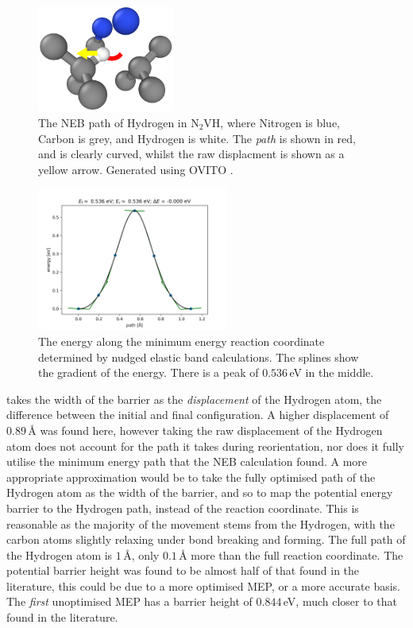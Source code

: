 \documentclass[10pt,a4paper,twocolumn,twoside]{extarticle}
\newcommand{\ntvh}{N$_2$VH}
\begin{document}
\begin{figure}
	\includegraphics[width=0.4\textwidth]{n2vh.png}
	\caption{The NEB path of Hydrogen in \ntvh, where Nitrogen is blue, Carbon is grey, and Hydrogen is white. The \emph{path} is shown in red, and is clearly curved, whilst the raw displacment is shown as a yellow arrow. Generated using OVITO \cite{OVITO}.}
	\label{fig:n2vh}
\end{figure}

\begin{figure}
	\includegraphics[width=0.56\textwidth]{fig.png}
	\caption{The energy along the minimum energy reaction coordinate determined by nudged elastic band calculations. The splines show the gradient of the energy. There is a peak of $0.536$\,eV in the middle.}
	\label{fig:n2vh_energy}
\end{figure}

\textcite{Peaker} takes the width of the barrier as the \emph{displacement} of the Hydrogen atom, the difference between the initial and final configuration. A higher displacement of $0.89$\,{\AA} was found here, however taking the raw displacement of the Hydrogen atom does not account for the path it takes during reorientation, nor does it fully utilise the minimum energy path that the NEB calculation found. A more appropriate approximation would be to take the fully optimised path of the Hydrogen atom as the width of the barrier, and so to map the potential energy barrier to the Hydrogen path, instead of the reaction coordinate. This is reasonable as the majority of the movement stems from the Hydrogen, with the carbon atoms slightly relaxing under bond breaking and forming. The full path of the Hydrogen atom is $1$\,{\AA}, only $0.1$\,{\AA} more than the full reaction coordinate. The potential barrier height was found to be almost half of that found in the literature, this could be due to a more optimised MEP, or a more accurate basis. The \emph{first} unoptimised MEP has a barrier height of $0.844$\,eV, much closer to that found in the literature. 
\end{document}
